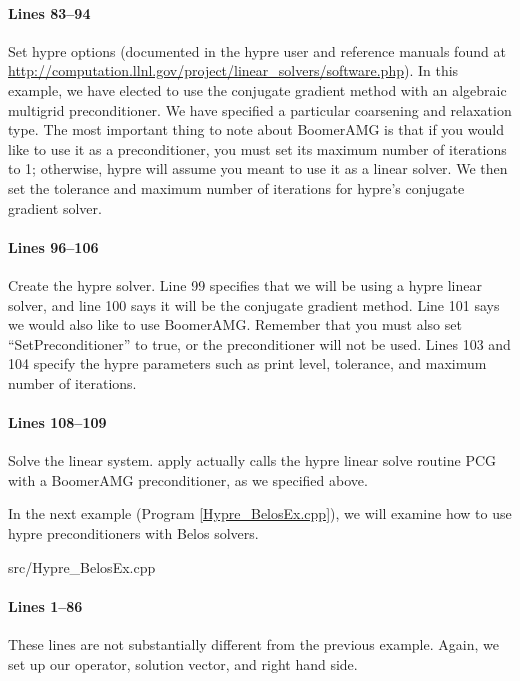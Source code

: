 \documentclass[pdf,12pt,report,strict]{SANDreport}
\begin{document}
\paragraph{Lines 83--94}
Set hypre options (documented in the hypre user and reference manuals found at
\url{http://computation.llnl.gov/project/linear_solvers/software.php}). In this
example, we have elected to use the conjugate gradient method with an algebraic
multigrid preconditioner.  We have specified a particular coarsening and
relaxation type.  The most important thing to note about BoomerAMG is that if
you would like to use it as a preconditioner, you must set its maximum number of
iterations to 1; otherwise, hypre will assume you meant to use it as a linear
solver.  We then set the tolerance and maximum number of iterations for hypre's
conjugate gradient solver.

\paragraph{Lines 96--106}
Create the hypre solver.  Line 99 specifies that we will be using a hypre linear
solver, and line 100 says it will be the conjugate gradient method.  Line 101
says we would also like to use BoomerAMG.  Remember that you must also set
``SetPreconditioner'' to true, or the preconditioner will not be used.  Lines
103 and 104 specify the hypre parameters such as print level, tolerance, and
maximum number of iterations.

\paragraph{Lines 108--109}
Solve the linear system.  apply actually calls the hypre linear solve routine
PCG with a BoomerAMG preconditioner, as we specified above.

In the next example (Program \ref{Hypre_BelosEx.cpp}), we will examine how to
use hypre preconditioners with Belos solvers.

\begin{lstinputlisting}[caption=Hypre\_BelosEx.cpp,label=Hypre_BelosEx.cpp]{src/Hypre_BelosEx.cpp}
\end{lstinputlisting}

\paragraph{Lines 1--86}
These lines are not substantially different from the previous example.  Again,
we set up our operator, solution vector, and right hand side.
\end{document}
